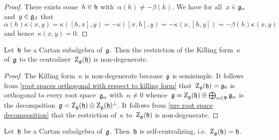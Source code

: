 \begin{proof}
 There exists some~$h \in \mathfrak{h}$ with~$\alpha(h) \neq -\beta(h)$.
 We have for all~$x \in \mathfrak{g}_\alpha$ and~$y \in \mathfrak{g}_\beta$ that
 \[
  \alpha(h) \kappa(x,y)
  =
  \kappa([h,x],y)
  =
  -\kappa([x,h],y)
  =
  -\kappa(x,[h,y])
  =
  -\beta(h) \kappa(x,y)
 \]
 and hence~$\kappa(x,y) = 0$.
\end{proof}


\begin{corollary}
  \label{restriction of killing form to centralizer is non-degenerate}
  Let~$\mathfrak{h}$ be a Cartan subalgebra of~$\mathfrak{g}$.
  Then the restriction of the Killing form~$\kappa$ of~$\mathfrak{g}$ to the centralizer~$\operatorname{Z}_{\mathfrak{g}}(\mathfrak{h})$ is non-degenerate.
\end{corollary}


\begin{proof}
  The Killing form~$\kappa$ is non-degenerate because~$\mathfrak{g}$ is semisimple.
  It follows from \cref{root spaces orthogonal with respect to killing form} that~$\operatorname{Z}_{\mathfrak{g}}(\mathfrak{h}) = \mathfrak{g}_0$ is orthogonal to every root space~$\mathfrak{g}_\alpha$ with~$\alpha \neq 0$ whence~$\mathfrak{g} = \operatorname{Z}_{\mathfrak{g}}(\mathfrak{h}) \oplus \bigoplus_{\alpha \in \Phi} \mathfrak{g}_\alpha$ is the decompsition~$\mathfrak{g} = \operatorname{Z}_{\mathfrak{g}}(\mathfrak{h}) \oplus \operatorname{Z}_{\mathfrak{g}}(\mathfrak{h})^\perp$.
  It follows from \cref{pre root space decomposition} that the restriction of~$\kappa$ to~$\operatorname{Z}_{\mathfrak{g}}(\mathfrak{h})$ is non-degenerate.
\end{proof}


\begin{proposition}
  \label{csa are self-centralizing}
  Let~$\mathfrak{h}$ be a Cartan subalgebra of~$\mathfrak{g}$.
  Then~$\mathfrak{h}$ is self-centralizing, i.e.~$\operatorname{Z}_{\mathfrak{g}}(\mathfrak{h}) = \mathfrak{h}$.
\end{proposition}


